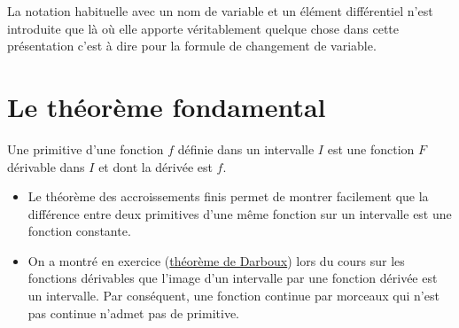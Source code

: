 

La notation habituelle avec un nom de variable et un élément différentiel n'est introduite que là où elle apporte véritablement quelque chose dans cette présentation c'est à dire pour la formule de changement de variable.
\section{Le théorème fondamental}
\begin{defi}
Une primitive d'une fonction $f$ définie dans un intervalle $I$ est une fonction $F$ dérivable dans $I$ et dont la dérivée est $f$. 
\end{defi}
\begin{rems}
 \begin{itemize}
  \item Le théorème des accroissements finis permet de montrer facilement que la différence entre deux primitives d'une même fonction sur un intervalle est une fonction constante.
  \item On a montré en exercice (\href{\baseurl C2070.pdf}{théorème de Darboux}) lors du cours sur les fonctions dérivables que l'image d'un intervalle par une fonction dérivée est un intervalle. Par conséquent, une fonction continue par morceaux qui n'est pas continue n'admet pas de primitive.
 \end{itemize}
\end{rems}

